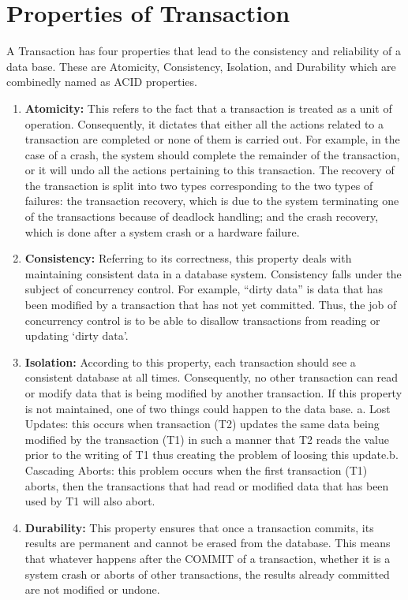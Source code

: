 \documentclass{article}
\begin{document}
\section*{Properties of Transaction}

A Transaction has four properties that lead to the consistency and reliability of a data base. These are Atomicity, Consistency, Isolation, and Durability which are combinedly named as ACID properties.
\begin{enumerate}


\item \textbf{Atomicity:}
This refers to the fact that a transaction is treated as a unit of operation. Consequently, it dictates that either all the actions related to a transaction are completed or none of them is carried out. For example, in the case of a crash, the system should complete the remainder of the transaction, or it will undo all the actions pertaining to this transaction. The recovery of the transaction is split into two types corresponding to the two types of failures: the transaction recovery, which is due to the system terminating one of the transactions because of deadlock handling; and the crash recovery, which is done after a system crash or a hardware failure.


\item \textbf{Consistency:}
Referring to its correctness, this property deals with maintaining consistent data in a database system. Consistency falls under the subject of concurrency control. For example, “dirty data” is data that has been modified by a transaction that has not yet committed. Thus, the job of concurrency control is to be able to disallow transactions from reading or updating ‘dirty data’.

\item \textbf{Isolation:}
According to this property, each transaction should see a consistent database at all times. Consequently, no other transaction can read or modify data that is being modified by another transaction. If this property is not maintained, one of two things could happen to the data base. a. Lost Updates: this occurs when transaction (T2) updates the same data being modified by the transaction (T1) in such a manner that T2 reads the value prior to the writing of T1 thus creating the problem of loosing this update.b. Cascading Aborts: this problem occurs when the first transaction (T1) aborts, then the transactions that had read or modified data that has been used by T1 will also abort. 

\item \textbf{Durability:}
This property ensures that once a transaction commits, its results are permanent and cannot be erased from the database. This means that whatever happens after the COMMIT of a transaction, whether it is a system crash or aborts of other transactions, the results already committed are not modified or undone.

\end{enumerate}
\end{document}
